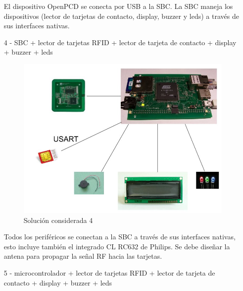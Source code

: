 \begin{itemize}
El dispositivo OpenPCD se conecta por USB a la SBC. La SBC maneja los dispositivos (lector de tarjetas de contacto, display, buzzer y leds) a través de sus interfaces nativas.

\bigskip
\bigskip
\item[4 -] SBC + lector de tarjetas RFID + lector de tarjeta de contacto + display + buzzer + leds
\bigskip

\begin{figure}[H]
\centering
  \begin{center}
  \includegraphics[scale=.25]{Imagenes/3.jpg} 
  \end{center}
  \caption{Solución considerada 4}\label{Fig:HW4} 
\end{figure}

Todos los periféricos se conectan a la SBC a través de sus interfaces nativas, esto incluye también el integrado CL RC632 de Philips. Se debe diseñar la antena para propagar la señal RF hacia las tarjetas.

\bigskip
\bigskip
\item[5 -] microcontrolador + lector de tarjetas RFID + lector de tarjeta de contacto + display + buzzer + leds
\bigskip


\end{itemize}
